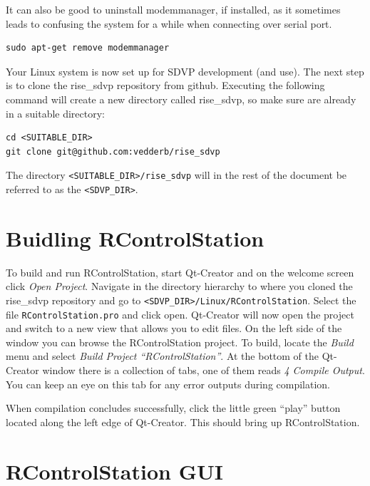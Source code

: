 \documentclass[12pt]{article} %
\begin{document}
It can also be good to uninstall modemmanager, if installed, as it sometimes leads to confusing the
system for a while when connecting over serial port.
\begin{Verbatim}
sudo apt-get remove modemmanager
\end{Verbatim}

Your Linux system is now set up for SDVP development (and use). The
next step is to clone the rise\_sdvp repository from github. Executing the
following command will create a new directory called rise\_sdvp, so make sure
are already in a suitable directory:
\begin{Verbatim}
cd <SUITABLE_DIR>   
git clone git@github.com:vedderb/rise_sdvp
\end{Verbatim}
The directory \texttt{<SUITABLE\_DIR>/rise\_sdvp} will in the rest of the document
be referred to as the \texttt{<SDVP\_DIR>}.


\section{Buidling RControlStation}

To build and run RControlStation, start Qt-Creator and on the welcome
screen click {\em Open Project}. Navigate in the directory hierarchy
to where you cloned the rise\_sdvp repository and go to
\texttt{<SDVP\_DIR>/Linux/RControlStation}. Select the file
\texttt{RControlStation.pro} and click open. Qt-Creator will now open
the project and switch to a new view that allows you to edit files.
On the left side of the window you can browse the RControlStation
project.  To build, locate the {\em Build} menu and select {\em Build
  Project ``RControlStation''}.  At the bottom of the Qt-Creator
window there is a collection of tabs, one of them reads {\em 4 Compile
  Output}. You can keep an eye on this tab for any error outputs
during compilation. 

When compilation concludes successfully, click the little green
``play'' button located along the left edge of Qt-Creator. This should
bring up RControlStation.

\section{RControlStation GUI}
\end{document}
